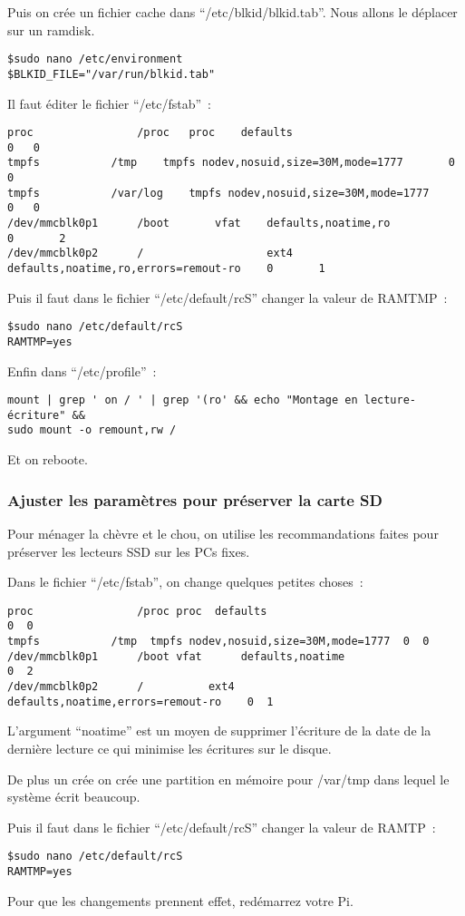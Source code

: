 Puis on crée un fichier cache dans ``/etc/blkid/blkid.tab''. Nous allons le déplacer sur un ramdisk.

\begin{verbatim}
$sudo nano /etc/environment
$BLKID_FILE="/var/run/blkid.tab"
\end{verbatim}

Il faut éditer le fichier ``/etc/fstab''~:

\begin{verbatim}
proc				/proc	proc    defaults							0	0
tmpfs			/tmp	tmpfs nodev,nosuid,size=30M,mode=1777		0	0
tmpfs			/var/log	tmpfs nodev,nosuid,size=30M,mode=1777		0	0
/dev/mmcblk0p1  	/boot      	vfat    defaults,noatime,ro          				0       2
/dev/mmcblk0p2  	/               	ext4    defaults,noatime,ro,errors=remout-ro 	0       1
\end{verbatim}

Puis il faut dans le fichier ``/etc/default/rcS'' changer la valeur de RAMTMP~:

\begin{verbatim}
$sudo nano /etc/default/rcS
RAMTMP=yes
\end{verbatim}

Enfin dans ``/etc/profile''~:
\begin{verbatim}
mount | grep ' on / ' | grep '(ro' && echo "Montage en lecture-écriture" && 
sudo mount -o remount,rw /
\end{verbatim}

Et on reboote.

\subsubsection{Ajuster les paramètres pour préserver la carte SD}

Pour ménager la chèvre et le chou, on utilise les recommandations faites pour préserver les lecteurs SSD sur les PCs fixes.

Dans le fichier ``/etc/fstab'', on change quelques petites choses~:

\begin{verbatim}
proc				/proc proc 	defaults						       0  0
tmpfs			/tmp  tmpfs	nodev,nosuid,size=30M,mode=1777  0  0
/dev/mmcblk0p1  	/boot vfat    	defaults,noatime          			        0  2
/dev/mmcblk0p2  	/          ext4    	defaults,noatime,errors=remout-ro    0  1
\end{verbatim}

L'argument ``noatime'' est un moyen de supprimer l'écriture de la date de la dernière lecture ce qui minimise les écritures sur le disque.

De plus un crée on crée une partition en mémoire pour /var/tmp dans lequel le système écrit beaucoup.

Puis il faut dans le fichier ``/etc/default/rcS'' changer la valeur de RAMTP~:

\begin{verbatim}
$sudo nano /etc/default/rcS
RAMTMP=yes
\end{verbatim}

Pour que les changements prennent effet, redémarrez votre Pi.